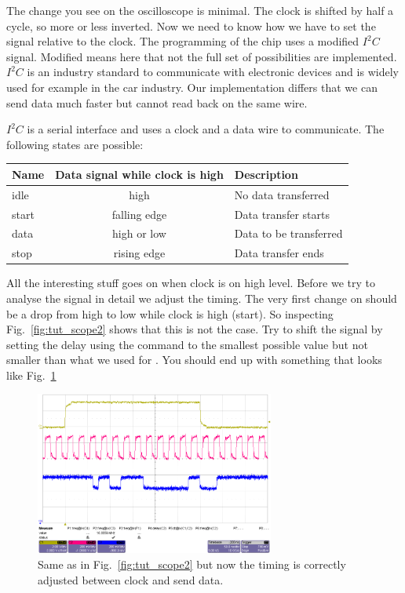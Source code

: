 \bigskip

The change you see on the oscilloscope is minimal. The clock is shifted by half a cycle, so more or less inverted. Now we need to know how we have to set the  signal relative to the clock. The programming of the chip uses a modified $I^2C$ signal. Modified means here that not the full set of possibilities are implemented. $I^2C$ is an industry standard to communicate with electronic devices and is widely used for example in the car industry. Our implementation differs that we can send data much faster but cannot read back on the same wire.

$I^2C$ is a serial interface and uses a clock and a data wire to communicate. The following states are possible:

\bigskip

\begin{tabular}{lcl}
    \toprule
Name & Data signal while clock is high & Description \\
    \midrule
idle & high & No data transferred \\
start & falling edge & Data transfer starts \\
data & high or low & Data to be transferred \\
stop & rising edge & Data transfer ends \\
    \bottomrule
\end{tabular}

\bigskip

All the interesting stuff goes on when clock is on high level. Before we try to analyse the signal in detail we adjust the timing. The very first change on  should be a drop from high to low while clock is high (start). So inspecting Fig.~\ref{fig:tut_scope2} shows that this is not the case. Try to shift the signal by setting the delay using the  command to the smallest possible value but not smaller than what we used for . You should end up with something that looks like Fig.~\ref{fig:tut_scope3}

\begin{figure}[h]
    \begin{center}
	\includegraphics[width=0.7\textwidth]{img/tut_scope3.png}
	\caption{Same as in Fig.~\ref{fig:tut_scope2} but now the timing is correctly adjusted between clock and send data.}
	\label{fig:tut_scope3}
    \end{center}
\end{figure}

